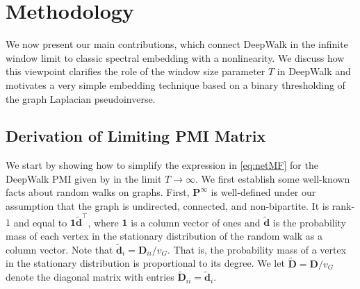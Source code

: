 \documentclass[sigconf]{acmart}
\newcommand{\mbf}[1]{\mathbf{#1}}
\newcommand{\bv}[1]{\mathbf{#1}}
\begin{document}
\section{Methodology}

We now present our main contributions, which connect DeepWalk in the infinite window limit to classic spectral embedding with a nonlinearity. We discuss how this viewpoint clarifies the role of the window size parameter $T$ in DeepWalk and motivates a very simple embedding technique based on a binary thresholding of the graph Laplacian pseudoinverse.

\subsection{Derivation of Limiting PMI Matrix}
We start  by showing how to simplify the expression in \eqref{eq:netMF} for the DeepWalk PMI  given by \cite{qiu2018network} in the limit $T \rightarrow \infty$.
We first establish some well-known facts about random walks on graphs. First, $\mbf{P}^\infty$ is well-defined under our assumption that the graph is undirected, connected, and non-bipartite. It is rank-$1$ and equal to $\mbf{1} \bm{\tilde{d}}^\top$, where $\mbf{1}$ is a column vector of ones and $\bm{\tilde{d}}$ is the probability mass of each vertex in the stationary distribution of the random walk as a column vector. Note that $\bm{\tilde{d}}_i = \bv{D}_{ii}/v_G$.  That is, the probability mass of a vertex in the stationary distribution is proportional to its degree. We let $\mbf{\tilde{D}} = \bv{D}/v_G$ denote the diagonal matrix with entries  $\mbf{\tilde{D}}_{ii} = \bm{\tilde{d}}_i$.%
\end{document}
